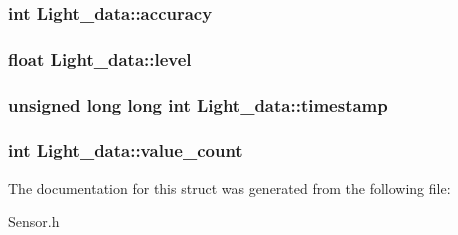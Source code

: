 \subsubsection[{accuracy}]{\setlength{\rightskip}{0pt plus 5cm}int Light\-\_\-data\-::accuracy}\label{structLight__data_a71b41900902193246039770ec51da22e}
\subsubsection[{level}]{\setlength{\rightskip}{0pt plus 5cm}float Light\-\_\-data\-::level}\label{structLight__data_ab50120a5a2d60a14e2b69e14c0ce9108}
\subsubsection[{timestamp}]{\setlength{\rightskip}{0pt plus 5cm}unsigned long long int Light\-\_\-data\-::timestamp}\label{structLight__data_a9f05ffeeecc1ec05ba0b5702f008dc97}
\subsubsection[{value\-\_\-count}]{\setlength{\rightskip}{0pt plus 5cm}int Light\-\_\-data\-::value\-\_\-count}\label{structLight__data_a514e362b40ebd045f4abbc3a2e0a6bdd}


The documentation for this struct was generated from the following file\-:\begin{DoxyCompactItemize}
\item 
Sensor.\-h\end{DoxyCompactItemize}
